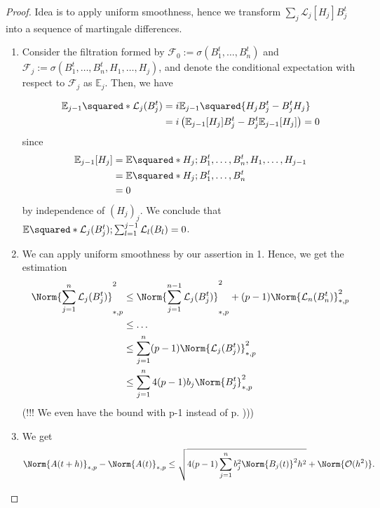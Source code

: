 \begin{proof}
  Idea is to apply uniform smoothness, hence we transform \(\sum_{j}^{} \mathcal{L}_j[H_j]B_j^{t}\) into a sequence of martingale differences. 
  \begin{enumerate}[1.]
    \item Consider the filtration formed by \(\mathcal{F}_0:= \sigma(B_1^{t},\dots,B_n^{t})\) and \(\mathcal{F}_j:= \sigma(B_1^{t},\dots,B_n^{t},H_1,\dots,H_j)\), and denote the conditional expectation with respect to \(\mathcal{F}_j\) as \(\mathbb{E}_j\). Then, we have
  
      \begin{align*}
        \mathbb{E}_{j-1} \squared*{\mathcal{L}_j(B_j^{t}) } &= i\mathbb{E}_{j-1}\squared{H_jB_j^{t}-B_j^{t}H_j} \\
                                                      &= i \left( \mathbb{E}_{j-1}[H_j]B_j^{t} -B_j^{t} \mathbb{E}_{j-1}[H_j] \right) = 0
      \end{align*}
      since 
      \begin{align*}\mathbb{E}_{j-1}[H_j] &= \mathbb{E} \squared*{H_j; B_1^{t},\dots,B_n^{t},H_1,\dots,H_{j-1}} \\
        &= \mathbb{E} \squared*{H_j; B_1^{t},\dots,B_n^{t}} \\
        &= 0
      \end{align*}
      by independence of \((H_j)_j\). We conclude that \(\mathbb{E} \squared*{\mathcal{L}_{j}(B_j^{t})}; \sum_{l=1}^{j-1} \mathcal{L}_{l}(B_l) =0\). 
    \item We can apply uniform smoothness by our assertion in 1. Hence, we get the estimation
      \begin{align*}
        \Norm{\sum_{j=1}^{n} \mathcal{L}_{j}(B_j^{t})}^{2}_{*,p} &\leq \Norm{\sum_{j=1}^{n-1}\mathcal{L}_{j}(B_j^{t})}_{*,p}^{2} + (p-1) \Norm{\mathcal{L}_{n}(B_n^{t})}_{*,p}^{2} \\
                                                             & \leq \dots \\
                                                             & \leq \sum_{j=1}^{n} (p-1) \Norm{\mathcal{L}_j(B_j^{t})}_{*,p}^{2} \\
                                                             & \leq \sum_{j=1}^{n} 4(p-1) b_j \Norm{B_j^{t}}_{*,p}^{2}
      \end{align*}
    (!!! We even have the bound with p-1 instead of p. )))
    \item We get 
      \[ \Norm{A(t+h)}_{*,p} -\Norm{A(t)}_{*,p}  \leq \sqrt{ 4 (p-1) \sum_{j=1}^{n}b_j^{2} \Norm{B_j(t)}_{}^{2}h^{2}} + \Norm{\mathcal{O}(h^{2})}.\]

\end{enumerate}
\end{proof}
